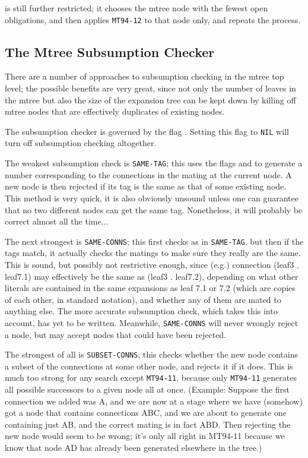  is still further restricted; it chooses the mtree node with the fewest open obligations,
and then applies {\tt MT94-12} to that node only, and repeats the process.

\subsection{The Mtree Subsumption Checker}

There are a number of approaches to subsumption checking in the mtree top level; the possible benefits
are very great, since not only the number of leaves in
the mtree but also the size of the expansion tree can be kept down by killing off mtree
nodes that are effectively duplicates of existing nodes.

The subsumption checker is governed by the flag . Setting this flag to {\tt NIL}
will turn off subsumption checking altogether.

The weakest subsumption check is {\tt SAME-TAG}; this uses the flags  and 
to generate a number corresponding to the connections in the mating at the current node. A new node is
then rejected if its tag is the same as that of some existing node. This method is very quick, it is also
obviously unsound unless one can guarantee that no two different nodes can get the same tag. Nonetheless, it
will probably be correct almost all the time...

The next strongest is {\tt SAME-CONNS}; this first checks as in {\tt SAME-TAG}, but then if the tags match, it actually
checks the matings to make sure they really are the same. This is sound, but possibly not restrictive enough,
since (e.g.) connection (leaf3 . leaf7.1) may effectively be the same as (leaf3 . leaf7.2), depending on
what other literals are contained in the same expansions as leaf 7.1 or 7.2 (which are copies of each other,
in standard {\TPS} notation), and whether any of them are mated to anything else.
The more accurate subsumption check, which takes this into account, has yet to be written. Meanwhile, {\tt SAME-CONNS}
will never wrongly reject a node, but may accept nodes that could have been rejected.

The strongest of all is {\tt SUBSET-CONNS}; this checks whether the new node contains a subset of the
connections at some other node, and rejects it if it does. This is much too strong for any search except {\tt MT94-11},
because only {\tt MT94-11} generates all possible successors to a given node all at once. (Example: Suppose the
first connection we added was A, and we are now at a stage where
we have (somehow) got a node that contains connections ABC, and we are about to generate one containing just AB, and the
correct mating is in fact ABD. Then rejecting the new node would seem to be wrong; it's only all right in MT94-11
because we know that node AD has already been generated elsewhere in the tree.)

